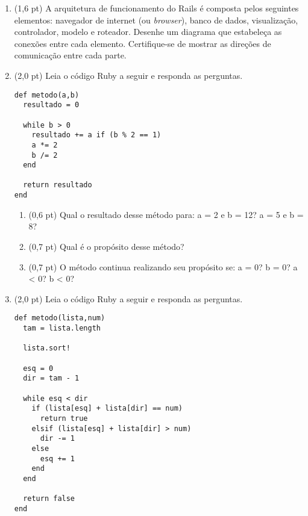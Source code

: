 \documentclass[a4paper,10pt]{article}
\begin{document}
\begin{multicols*}{2}
\begin{enumerate}
  \item (1,6 pt) A arquitetura de funcionamento do Rails é composta pelos seguintes elementos: navegador de internet (ou \textit{browser}), banco de dados, visualização, controlador, modelo e roteador. Desenhe um diagrama que estabeleça as conexões entre cada elemento. Certifique-se de mostrar as direções de comunicação entre cada parte.

  \bigskip\bigskip

  \item (2,0 pt) Leia o código Ruby a seguir e responda as perguntas.

  \begin{verbatim}
def metodo(a,b)
  resultado = 0

  while b > 0
    resultado += a if (b % 2 == 1)
    a *= 2
    b /= 2
  end

  return resultado
end
  \end{verbatim}

  \begin{enumerate}
    \item (0,6 pt) Qual o resultado desse método para: a = 2 e b = 12? a = 5 e b = 8? %
    \item (0,7 pt) Qual é o propósito desse método?
    \item (0,7 pt) O método continua realizando seu propósito se: a = 0? b = 0? a < 0? b < 0? %
  \end{enumerate}

  \item (2,0 pt) Leia o código Ruby a seguir e responda as perguntas.

  \begin{verbatim}
def metodo(lista,num)
  tam = lista.length

  lista.sort!

  esq = 0
  dir = tam - 1

  while esq < dir
    if (lista[esq] + lista[dir] == num)
      return true
    elsif (lista[esq] + lista[dir] > num)
      dir -= 1
    else
      esq += 1
    end
  end

  return false
end
  \end{verbatim}


\end{enumerate}
\end{multicols*}
\end{document}
